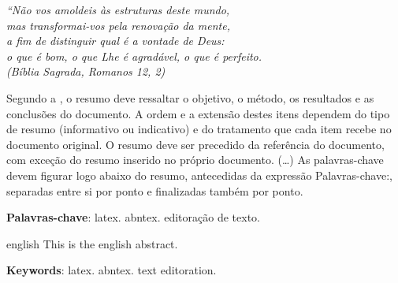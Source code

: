 \documentclass[
	12pt,				%
	openany,			%
	twoside,			%
	a4paper,			%
	chapter=TITLE,		%
	section=Title,		%
	subsection=Title,	%
	subsubsection=Title,%
	english,			%
	french,				%
	spanish,			%
	brazil			%
	]{abntex2}
\begin{document}
\begin{ERRATA}
\begin{agradecimentos}
\end{agradecimentos}

\begin{epigrafe}
    \vspace*{\fill}
	\begin{flushright}
		\textit{``Não vos amoldeis às estruturas deste mundo, \\
		mas transformai-vos pela renovação da mente, \\
		a fim de distinguir qual é a vontade de Deus: \\
		o que é bom, o que Lhe é agradável, o que é perfeito.\\
		(Bíblia Sagrada, Romanos 12, 2)}
	\end{flushright}
\end{epigrafe}


\setlength{\absparsep}{18pt} %
\begin{resumo}
 Segundo a , o resumo deve ressaltar o
 objetivo, o método, os resultados e as conclusões do documento. A ordem e a extensão
 destes itens dependem do tipo de resumo (informativo ou indicativo) e do
 tratamento que cada item recebe no documento original. O resumo deve ser
 precedido da referência do documento, com exceção do resumo inserido no
 próprio documento. (\ldots) As palavras-chave devem figurar logo abaixo do
 resumo, antecedidas da expressão Palavras-chave:, separadas entre si por
 ponto e finalizadas também por ponto.

 \textbf{Palavras-chave}: latex. abntex. editoração de texto.
\end{resumo}

\begin{resumo}[ABSTRACT]
 \begin{otherlanguage*}{english}
   This is the english abstract.

   \vspace{\onelineskip}
 
   \noindent 
   \textbf{Keywords}: latex. abntex. text editoration.
 \end{otherlanguage*}
\end{resumo}



\listoffigures*
\cleardoublepage


\end{ERRATA}
\end{document}
